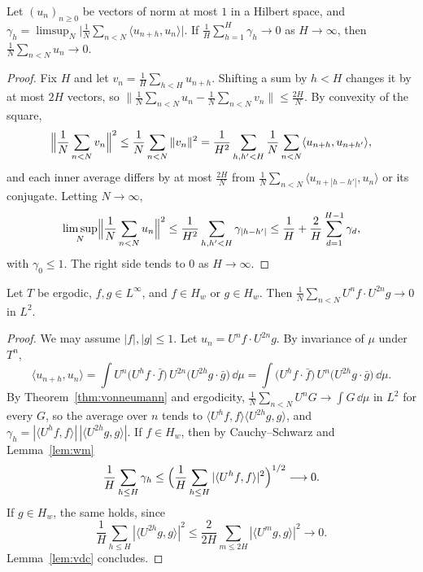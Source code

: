 \begin{lemma}\label{lem:vdc}
Let $(u_n)_{n\ge0}$ be vectors of norm at most $1$ in a Hilbert space, and $\gamma_h=\limsup_N\bigl|\frac1N\sum_{n<N}\langle u_{n+h},u_n\rangle\bigr|$. If $\frac1H\sum_{h=1}^{H}\gamma_h\to0$ as $H\to\infty$, then $\frac1N\sum_{n<N}u_n\to0$.
\end{lemma}
\begin{proof}
Fix $H$ and let $v_n=\frac1H\sum_{h<H}u_{n+h}$. Shifting a sum by $h<H$ changes it by at most $2H$ vectors, so $\bigl\|\frac1N\sum_{n<N}u_n-\frac1N\sum_{n<N}v_n\bigr\|\le\frac{2H}N$. By convexity of the square,
\[
\Bigl\|\frac1N\sum_{n<N}v_n\Bigr\|^2\le\frac1N\sum_{n<N}\|v_n\|^2=\frac1{H^2}\sum_{h,h'<H}\frac1N\sum_{n<N}\langle u_{n+h},u_{n+h'}\rangle,
\]
and each inner average differs by at most $\frac{2H}N$ from $\frac1N\sum_{n<N}\langle u_{n+|h-h'|},u_n\rangle$ or its conjugate. Letting $N\to\infty$,
\[
\limsup_N\Bigl\|\frac1N\sum_{n<N}u_n\Bigr\|^2\le\frac1{H^2}\sum_{h,h'<H}\gamma_{|h-h'|}\le\frac1H+\frac2H\sum_{d=1}^{H-1}\gamma_d,
\]
with $\gamma_0\le1$. The right side tends to $0$ as $H\to\infty$.
\end{proof}

\begin{lemma}\label{lem:wmaverage}
Let $T$ be ergodic, $f,g\in L^\infty$, and $f\in H_w$ or $g\in H_w$. Then $\frac1N\sum_{n<N}U^nf\cdot U^{2n}g\to0$ in $L^2$.
\end{lemma}
\begin{proof}
We may assume $|f|,|g|\le1$. Let $u_n=U^nf\cdot U^{2n}g$. By invariance of $\mu$ under $T^n$,
\[
\langle u_{n+h},u_n\rangle=\int U^n\bigl(U^hf\cdot\bar f\bigr)\,U^{2n}\bigl(U^{2h}g\cdot\bar g\bigr)\,\dd\mu=\int\bigl(U^hf\cdot\bar f\bigr)\,U^n\bigl(U^{2h}g\cdot\bar g\bigr)\,\dd\mu .
\]
By Theorem~\ref{thm:vonneumann} and ergodicity, $\frac1N\sum_{n<N}U^nG\to\int G\,\dd\mu$ in $L^2$ for every $G$, so the average over $n$ tends to $\langle U^hf,f\rangle\langle U^{2h}g,g\rangle$, and
$\gamma_h=|\langle U^hf,f\rangle|\,|\langle U^{2h}g,g\rangle|$. If $f\in H_w$, then by Cauchy--Schwarz and Lemma~\ref{lem:wm}
\[
\frac1H\sum_{h\le H}\gamma_h\le\Bigl(\frac1H\sum_{h\le H}|\langle U^hf,f\rangle|^2\Bigr)^{1/2}\longrightarrow0.
\]
If $g\in H_w$, the same holds, since
\[
\frac1H\sum_{h\le H}|\langle U^{2h}g,g\rangle|^2\le\frac2{2H}\sum_{m\le2H}|\langle U^mg,g\rangle|^2\longrightarrow0.
\]
Lemma~\ref{lem:vdc} concludes.
\end{proof}

